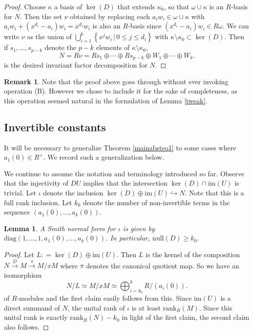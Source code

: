 \documentclass[11pt]{article}
\newtheorem{lemma}[theo]{Lemma}
\theoremstyle{definition}
\newtheorem{remark}[theo]{Remark}
\numberwithin{equation}{section}
\newcommand{\im}{\mathrm{im}}
\begin{document}
\begin{proof}
Choose $ \kappa $ a basis of $ \ker(D) $ that extends $ \kappa_{0} $, so that $ \omega  \cup \kappa  $ is an $ R $-basis for $ N $. Then the set $ \nu  $ obtained by replacing each $ a_{i} w_{i} \in \omega \cup \kappa $ with $  a_{i} w_{i} + ( x^{d_{i}}     - a_{i})w_{i}  = x^{d_{i}} w_{i} $ is also an $ R $-basis since $ (x^{d_{i}} - a_{i})   w_{i} \in  R \omega $.  We can write $ \nu  $ as the union of  $ \bigcup_{i=1}^{k} \left \{ x^{j} w_{i} \,  |  \, 0 \leq j \leq d_{i}  \right \} $ with $ \kappa \setminus \kappa_{0} \subset \ker(D)  $. Then if    $ s_{1}, \dots, s_{p -k } $ denote the $  p - k $ elements of $ \kappa \setminus \kappa_{0} $, $$  N = R \nu  =  R s_{1} \oplus \cdots \oplus R s_{p - k } \oplus  W_{1} \oplus \cdots \oplus W_{k}  . %
$$ 
is the desired  invariant factor decomposition for $ N $.   
\end{proof}      
\begin{remark} Note that the proof above goes through without ever invoking operation (B). However we chose to include it for the sake of completeness, as this operation seemed natural in the formulation of Lemma \ref{tweak}.   
\end{remark} 


\subsection{Invertible constants} 

It will be necessary to generalize  Theorem \ref{mainabsteo1} to some cases where $ a_{1}(0) \in R^{\times} $.  We record such a generalization  below.  


  We continue to assume the notation and terminology introduced so far.  Observe that the injectivity of $ DU $ implies that  the intersection $ \ker(D) \cap  \mathrm{im}(U) $ is trivial.  
Let $ \iota $ denote the inclusion $ \ker(D) \oplus \mathrm{im}(U)  \hookrightarrow N $. Note that this is a full rank inclusion. Let  $ k_{0}   $ denote the  number of non-invertible terms in the sequence $ (  a_{1}(0) , \ldots,  a_{k}(0)) $.   
\begin{lemma} \label{smithofD}   A Smith normal form for $ \iota $ is given  by   $  \mathrm{diag}(1,\ldots,1, a_{1}(0), \ldots,  a_{k}(0)) $. In particular, $ \mathrm{null}(D)  \geq  k_{0}    $. \end{lemma}    
\begin{proof}      Let $ L : =  \ker(D) \oplus \im(U  )$. Then $ L $ is the kernel of  the composition  $   N   \xrightarrow{D }  M  \xrightarrow{\, \pi  \, }   M / x M  $ 
where $ \pi $ denotes the canonical quotient map. So we have an isomorphism $$ N /  L  \simeq  M / x M  \simeq \bigoplus _{ i  = k_{0} } ^   {  k  }   R/(a_{i}(0)).  $$
of $ R $-modules and the  first claim easily follows from this.   Since  $ \mathrm{im}(U) $ is a  direct   summand of $ N $, the unital rank of $ \iota $ is at least $ \mathrm{rank}_{R}(M) $. Since this  unital rank 
is  exactly   $ \mathrm{rank}_{R} (N )  -  k_{0}    $ in light of  the first claim,  the second  claim also  follows.    
\end{proof}  
\end{document}
